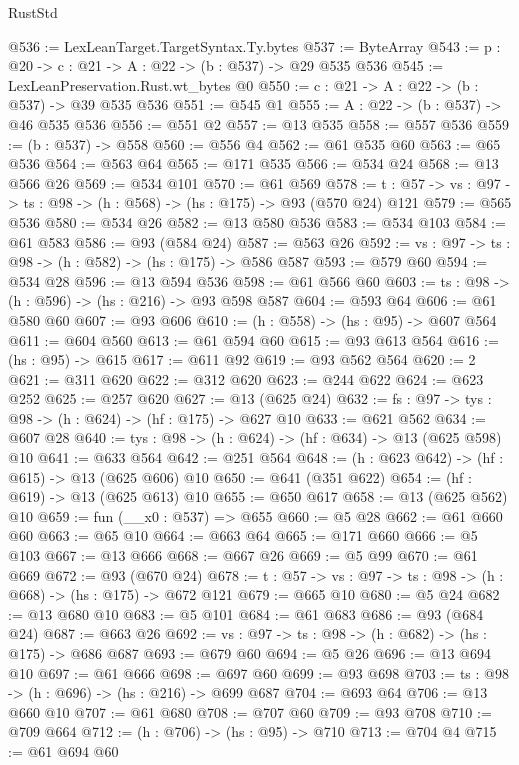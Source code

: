 \begin{lexlean}{RustStd}
\begin{coremodule}
@536 := LexLeanTarget.TargetSyntax.Ty.bytes
@537 := ByteArray
@543 := {p : @20} -> {c : @21} -> {A : @22} -> (b : @537) -> @29 @535 @536
@545 := LexLeanPreservation.Rust.wt_bytes @0
@550 := {c : @21} -> {A : @22} -> (b : @537) -> @39 @535 @536
@551 := @545 @1
@555 := {A : @22} -> (b : @537) -> @46 @535 @536
@556 := @551 @2
@557 := @13 @535
@558 := @557 @536
@559 := (b : @537) -> @558
@560 := @556 @4
@562 := @61 @535 @60
@563 := @65 @536
@564 := @563 @64
@565 := @171 @535
@566 := @534 @24
@568 := @13 @566 @26
@569 := @534 @101
@570 := @61 @569
@578 := {t : @57} -> {vs : @97} -> {ts : @98} -> (h : @568) -> (hs : @175) -> @93 (@570 @24) @121
@579 := @565 @536
@580 := @534 @26
@582 := @13 @580 @536
@583 := @534 @103
@584 := @61 @583
@586 := @93 (@584 @24)
@587 := @563 @26
@592 := {vs : @97} -> {ts : @98} -> (h : @582) -> (hs : @175) -> @586 @587
@593 := @579 @60
@594 := @534 @28
@596 := @13 @594 @536
@598 := @61 @566 @60
@603 := {ts : @98} -> (h : @596) -> (hs : @216) -> @93 @598 @587
@604 := @593 @64
@606 := @61 @580 @60
@607 := @93 @606
@610 := (h : @558) -> (hs : @95) -> @607 @564
@611 := @604 @560
@613 := @61 @594 @60
@615 := @93 @613 @564
@616 := (hs : @95) -> @615
@617 := @611 @92
@619 := @93 @562 @564
@620 := 2
@621 := @311 @620
@622 := @312 @620
@623 := @244 @622
@624 := @623 @252
@625 := @257 @620
@627 := @13 (@625 @24)
@632 := {fs : @97} -> {tys : @98} -> (h : @624) -> (hf : @175) -> @627 @10
@633 := @621 @562
@634 := @607 @28
@640 := {tys : @98} -> (h : @624) -> (hf : @634) -> @13 (@625 @598) @10
@641 := @633 @564
@642 := @251 @564
@648 := (h : @623 @642) -> (hf : @615) -> @13 (@625 @606) @10
@650 := @641 (@351 @622)
@654 := (hf : @619) -> @13 (@625 @613) @10
@655 := @650 @617
@658 := @13 (@625 @562) @10
@659 := fun (__x0 : @537) => @655
@660 := @5 @28
@662 := @61 @660 @60
@663 := @65 @10
@664 := @663 @64
@665 := @171 @660
@666 := @5 @103
@667 := @13 @666
@668 := @667 @26
@669 := @5 @99
@670 := @61 @669
@672 := @93 (@670 @24)
@678 := {t : @57} -> {vs : @97} -> {ts : @98} -> (h : @668) -> (hs : @175) -> @672 @121
@679 := @665 @10
@680 := @5 @24
@682 := @13 @680 @10
@683 := @5 @101
@684 := @61 @683
@686 := @93 (@684 @24)
@687 := @663 @26
@692 := {vs : @97} -> {ts : @98} -> (h : @682) -> (hs : @175) -> @686 @687
@693 := @679 @60
@694 := @5 @26
@696 := @13 @694 @10
@697 := @61 @666
@698 := @697 @60
@699 := @93 @698
@703 := {ts : @98} -> (h : @696) -> (hs : @216) -> @699 @687
@704 := @693 @64
@706 := @13 @660 @10
@707 := @61 @680
@708 := @707 @60
@709 := @93 @708
@710 := @709 @664
@712 := (h : @706) -> (hs : @95) -> @710
@713 := @704 @4
@715 := @61 @694 @60

\end{coremodule}
\end{lexlean}
